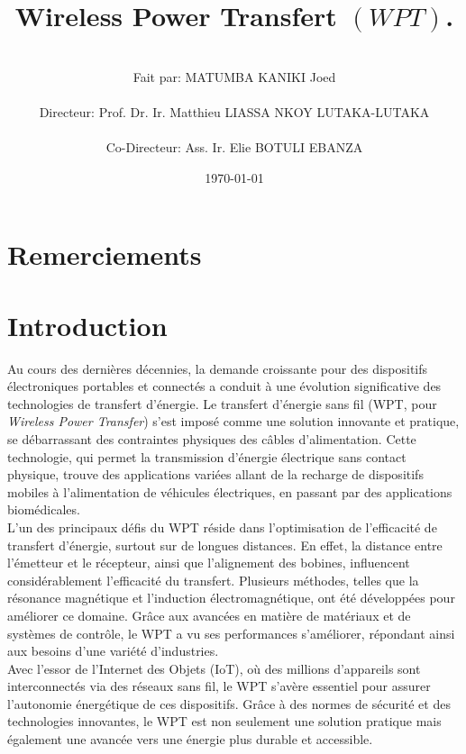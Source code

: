 \documentclass[12pt,a4paper,titlepage,notitlepage]{article}
\title{\textbf{Wireless Power Transfert} $\left( WPT\right)$. \vspace{5cm}}
\author{ \ \\Fait par: MATUMBA KANIKI Joed\\ \ \\ Directeur: Prof. Dr. Ir. Matthieu LIASSA NKOY LUTAKA-LUTAKA\\ \ \\ Co-Directeur: Ass. Ir. Elie BOTULI EBANZA\\ }
\date{\vfill \today }
\begin{document}
	\maketitle
	\newpage
	\tableofcontents
	
	\newpage
	\section*{Remerciements}
	\newpage
	
	\vspace{2cm}
	\section{Introduction}	
	\vspace{1cm}	
	Au cours des dernières décennies, la demande croissante pour des dispositifs électroniques portables et connectés a conduit à une évolution significative des technologies de transfert d'énergie. Le transfert d'énergie sans fil (WPT, pour \emph{Wireless Power Transfer}) s'est imposé comme une solution innovante et pratique, se débarrassant des contraintes physiques des câbles d'alimentation. Cette technologie, qui permet la transmission d'énergie électrique sans contact physique, trouve des applications variées allant de la recharge de dispositifs mobiles à l'alimentation de véhicules électriques, en passant par des applications biomédicales.\\
	
	L'un des principaux défis du WPT réside dans l'optimisation de l'efficacité de transfert d'énergie, surtout sur de longues distances. En effet, la distance entre l'émetteur et le récepteur, ainsi que l'alignement des bobines, influencent considérablement l'efficacité du transfert. Plusieurs méthodes, telles que la résonance magnétique et l'induction électromagnétique, ont été développées pour améliorer ce domaine. Grâce aux avancées en matière de matériaux et de systèmes de contrôle, le WPT a vu ses performances s'améliorer, répondant ainsi aux besoins d'une variété d'industries.\\
	
	
	Avec l'essor de l'Internet des Objets (IoT), où des millions d'appareils sont interconnectés via des réseaux sans fil, le WPT s'avère essentiel pour assurer l'autonomie énergétique de ces dispositifs. Grâce à des normes de sécurité et des technologies innovantes, le WPT est non seulement une solution pratique mais également une avancée vers une énergie plus durable et accessible.\\
	
\end{document}
